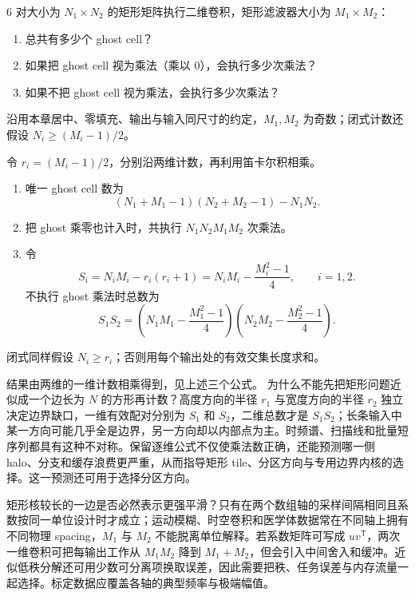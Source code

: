 \begin{solutionexercise}{6}
\problemheading 对大小为 $N_1\times N_2$ 的矩形矩阵执行二维卷积，矩形滤波器大小为
$M_1\times M_2$：
\begin{enumerate}[label=\alph*.,leftmargin=2.2em]
  \item 总共有多少个 ghost cell？
  \item 如果把 ghost cell 视为乘法（乘以 0），会执行多少次乘法？
  \item 如果不把 ghost cell 视为乘法，会执行多少次乘法？
\end{enumerate}
沿用本章居中、零填充、输出与输入同尺寸的约定，$M_1,M_2$ 为奇数；闭式计数还假设
$N_i\ge (M_i-1)/2$。

\approachheading 令 $r_i=(M_i-1)/2$，分别沿两维计数，再利用笛卡尔积相乘。

\answerheading
\begin{enumerate}[label=\alph*.,leftmargin=2.2em]
\item 唯一 ghost cell 数为
\[
(N_1+M_1-1)(N_2+M_2-1)-N_1N_2.
\]
\item 把 ghost 乘零也计入时，共执行 $N_1N_2M_1M_2$ 次乘法。
\item 令
\[
S_i=N_iM_i-r_i(r_i+1)
   =N_iM_i-\frac{M_i^2-1}{4},\qquad i=1,2.
\]
不执行 ghost 乘法时总数为
\[
S_1S_2=\left(N_1M_1-\frac{M_1^2-1}{4}\right)
        \left(N_2M_2-\frac{M_2^2-1}{4}\right).
\]
\end{enumerate}
闭式同样假设 $N_i\ge r_i$；否则用每个输出处的有效交集长度求和。

\conclusionheading 结果由两维的一维计数相乘得到，见上述三个公式。
\discussionheading
{}
为什么不能先把矩形问题近似成一个边长为 $N$ 的方形再计数？高度方向的半径 $r_1$ 与宽度方向的半径 $r_2$ 独立决定边界缺口，一维有效配对分别为 $S_1$ 和 $S_2$，二维总数才是 $S_1S_2$；长条输入中某一方向可能几乎全是边界，另一方向却以内部点为主。时频谱、扫描线和批量短序列都具有这种不对称。保留逐维公式不仅使乘法数正确，还能预测哪一侧 halo、分支和缓存浪费更严重，从而指导矩形 tile、分区方向与专用边界内核的选择。这一预测还可用于选择分区方向。

矩形核较长的一边是否必然表示更强平滑？只有在两个数组轴的采样间隔相同且系数按同一单位设计时才成立；运动模糊、时空卷积和医学体数据常在不同轴上拥有不同物理 spacing，$M_1$ 与 $M_2$ 不能脱离单位解释。若系数矩阵可写成 $uv^{\mathsf T}$，两次一维卷积可把每输出工作从 $M_1M_2$ 降到 $M_1+M_2$，但会引入中间舍入和缓冲。近似低秩分解还可用少数可分离项换取误差，因此需要把秩、任务误差与内存流量一起选择。标定数据应覆盖各轴的典型频率与极端幅值。


\end{solutionexercise}
